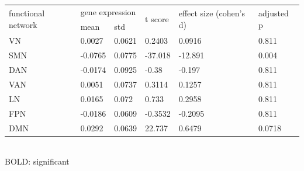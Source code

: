 \begin{refsection}
\begin{table}[H]
\small
{}\selectfont
{} \label{table3S2} 
\begin{tabular}{@{}llllll@{}}
\toprule
\multirow{2}{*}{functional network} & \multicolumn{2}{l}{gene expression} & \multirow{2}{*}{t score} & \multirow{2}{*}{effect size (cohen's d)} & \multirow{2}{*}{adjusted p} \\ \cmidrule(lr){2-3}
                                    & mean              & std             &                          &                                          &                                   \\ \hline 
VN                                  & 0.0027            & 0.0621          & 0.2403                   & 0.0916                                   & 0.811                             \\
SMN                                 & -0.0765           & 0.0775          & -37.018                  & -12.891                                  & 0.004                             \\
DAN                                 & -0.0174           & 0.0925          & -0.38                    & -0.197                                   & 0.811                             \\
VAN                                 & 0.0051            & 0.0737          & 0.3114                   & 0.1257                                   & 0.811                             \\
LN                                  & 0.0165            & 0.072           & 0.733                    & 0.2958                                   & 0.811                             \\
FPN                                 & -0.0186           & 0.0609          & -0.3532                  & -0.2095                                  & 0.811                             \\
DMN                                 & 0.0292            & 0.0639          & 22.737                   & 0.6479                                   & 0.0718                            \\ \bottomrule
\end{tabular}\\
{\scriptsize BOLD: significant}
\end{table}



\end{refsection}
